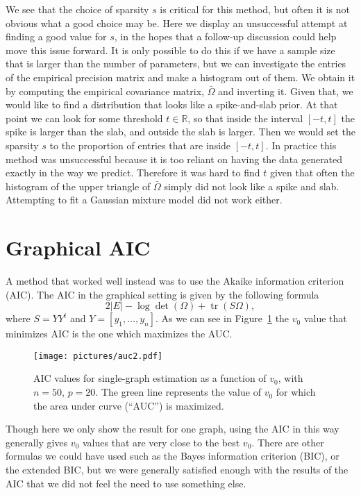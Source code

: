 \documentclass[a4paper, 11pt, oneside]{report}
\DeclareMathOperator{\tr}{tr}
\newcommand{\1}{\mathds{1}}
\begin{document}
We see that the choice of sparsity $s$ is critical for this method, but often it is 
not obvious what a good choice may be. Here we display an unsuccessful attempt at
finding a good value for $s$, in the hopes that a follow-up discussion could help
move this issue forward.
It is only possible to do this if we have a sample size that is larger than the number of parameters,
but we can investigate the entries of the empirical precision matrix and make a histogram out of them.
We obtain it by computing the empirical covariance matrix, $\bar \Omega$ and inverting it.
Given that, we would like to find a distribution that looks like a spike-and-slab prior. 
At that point we can look for some threshold $t \in \mathbb{R}$, so that inside the interval
$[-t, t]$ the spike is larger than the slab, and outside the slab is larger.
Then we would set the sparsity $s$ to the proportion of entries that are inside $[-t, t]$.
In practice this method was unsuccessful because it is too reliant on having the data generated exactly in the way we predict.
Therefore it was hard to find $t$ given that often the histogram of the upper triangle of $\bar \Omega$ 
simply did not look like a spike and slab. Attempting to fit a Gaussian mixture model did not work either.

\section{Graphical AIC}\label{sect:graphical-aic}
A method that worked well instead was to use the Akaike information criterion (AIC). 
The AIC in the graphical setting is given by the following formula
\[2|E| - \log\det(\Omega) + \tr(S \Omega),\]
where $S = YY^t$ and $Y = [y_1, \dots, y_n]$.
As we can see in Figure~\ref{fig:aic} the $v_0$ value that minimizes AIC is the one which maximizes
the AUC.
\begin{figure}[ht]
  \begin{center}
    \texttt{[image: pictures/auc2.pdf]}
  \end{center}
  \caption{AIC values for single-graph estimation as a function of $v_0$, with $n=50$, $p=20$.
  The green line represents the value of $v_0$ for which the area under curve (``AUC'') is maximized.
}
  \label{fig:aic}
\end{figure}
Though here we only show the result for one graph, using the AIC in this way generally gives
$v_0$ values that are very close to the best $v_0$.
There are other formulas we could have used such as the Bayes information criterion (BIC), or the
extended BIC, but we were generally satisfied enough with the results of the AIC that we did not
feel the need to use something else.
\end{document}
